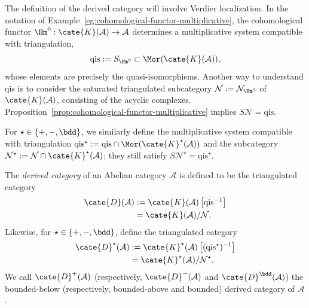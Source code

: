 The definition of the derived category will involve Verdier localization.
In the notation of Example~\ref{eg:cohomological-functor-multiplicative}, the
cohomological functor $\Hm^0: \cate{K}(\mathcal{A}) \to \mathcal{A}$
determines a multiplicative system compatible with triangulation,
\[ \mathrm{qis} := S_{\Hm^0} \subset \Mor(\cate{K}(\mathcal{A})), \]
whose elements are precisely the quasi-isomorphisms. Another way to
understand $\mathrm{qis}$ is to consider the saturated triangulated
subcategory
$\mathcal{N} := \mathcal{N}_{\Hm^0}$ of $\cate{K}(\mathcal{A})$, consisting
of the acyclic complexes.
Proposition~\ref{prop:cohomological-functor-multiplicative} implies
$S\mathcal{N} = \mathrm{qis}$.

For $\star \in \{+, -, \bdd\}$, we similarly define the multiplicative
system compatible with triangulation
$\mathrm{qis}^\star := \mathrm{qis} \cap
\Mor(\cate{K}^\star(\mathcal{A}))$ and the subcategory
$\mathcal{N}^\star := \mathcal{N} \cap \cate{K}^\star(\mathcal{A})$; they
still satisfy $S\mathcal{N}^\star = \mathrm{qis}^\star$.

\begin{definition}\label{def:derived-cat}
	The \emph{derived category} of an Abelian category $\mathcal{A}$ is
	defined to be the triangulated category
	\begin{align*}
		\cate{D}(\mathcal{A}) & := \cate{K}(\mathcal{A})\left[ \mathrm{qis}^{-1} \right] \\
		& = \cate{K}(\mathcal{A})/\mathcal{N}.
	\end{align*}
	Likewise, for $\star \in \{+, -, \bdd\}$, define the triangulated category
	\begin{align*}
		\cate{D}^\star(\mathcal{A}) & := \cate{K}^\star(\mathcal{A})\left[ (\mathrm{qis}^\star)^{-1} \right] \\
		& = \cate{K}^\star(\mathcal{A})/\mathcal{N}^\star .
	\end{align*}
	We call $\cate{D}^+(\mathcal{A})$ (respectively,
	$\cate{D}^-(\mathcal{A})$ and $\cate{D}^\bdd(\mathcal{A})$) the
	bounded-below (respectively, bounded-above and bounded) derived category
	of $\mathcal{A}$.
\end{definition}

